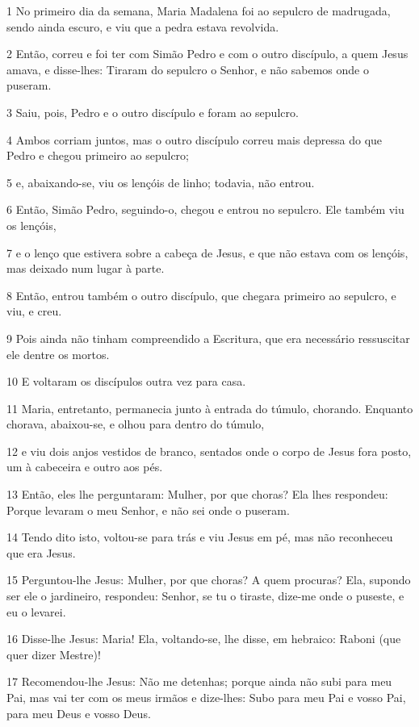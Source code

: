 \par 1 No primeiro dia da semana, Maria Madalena foi ao sepulcro de madrugada, sendo ainda escuro, e viu que a pedra estava revolvida.
\par 2 Então, correu e foi ter com Simão Pedro e com o outro discípulo, a quem Jesus amava, e disse-lhes: Tiraram do sepulcro o Senhor, e não sabemos onde o puseram.
\par 3 Saiu, pois, Pedro e o outro discípulo e foram ao sepulcro.
\par 4 Ambos corriam juntos, mas o outro discípulo correu mais depressa do que Pedro e chegou primeiro ao sepulcro;
\par 5 e, abaixando-se, viu os lençóis de linho; todavia, não entrou.
\par 6 Então, Simão Pedro, seguindo-o, chegou e entrou no sepulcro. Ele também viu os lençóis,
\par 7 e o lenço que estivera sobre a cabeça de Jesus, e que não estava com os lençóis, mas deixado num lugar à parte.
\par 8 Então, entrou também o outro discípulo, que chegara primeiro ao sepulcro, e viu, e creu.
\par 9 Pois ainda não tinham compreendido a Escritura, que era necessário ressuscitar ele dentre os mortos.
\par 10 E voltaram os discípulos outra vez para casa.
\par 11 Maria, entretanto, permanecia junto à entrada do túmulo, chorando. Enquanto chorava, abaixou-se, e olhou para dentro do túmulo,
\par 12 e viu dois anjos vestidos de branco, sentados onde o corpo de Jesus fora posto, um à cabeceira e outro aos pés.
\par 13 Então, eles lhe perguntaram: Mulher, por que choras? Ela lhes respondeu: Porque levaram o meu Senhor, e não sei onde o puseram.
\par 14 Tendo dito isto, voltou-se para trás e viu Jesus em pé, mas não reconheceu que era Jesus.
\par 15 Perguntou-lhe Jesus: Mulher, por que choras? A quem procuras? Ela, supondo ser ele o jardineiro, respondeu: Senhor, se tu o tiraste, dize-me onde o puseste, e eu o levarei.
\par 16 Disse-lhe Jesus: Maria! Ela, voltando-se, lhe disse, em hebraico: Raboni (que quer dizer Mestre)!
\par 17 Recomendou-lhe Jesus: Não me detenhas; porque ainda não subi para meu Pai, mas vai ter com os meus irmãos e dize-lhes: Subo para meu Pai e vosso Pai, para meu Deus e vosso Deus.
